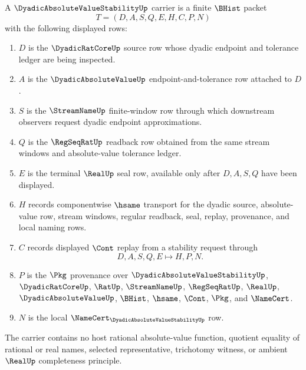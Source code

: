 \begin{definition}
\label{def:dyadic-absolute-value-stability-carrier}
A $\DyadicAbsoluteValueStabilityUp$ carrier is a finite $\BHist$ packet
$$
T=(D,A,S,Q,E,H,C,P,N)
$$
with the following displayed rows:
\begin{enumerate}
\item $D$ is the $\DyadicRatCoreUp$ source row whose dyadic endpoint and tolerance ledger are being inspected.
\item $A$ is the $\DyadicAbsoluteValueUp$ endpoint-and-tolerance row attached to $D$.
\item $S$ is the $\StreamNameUp$ finite-window row through which downstream observers request dyadic endpoint approximations.
\item $Q$ is the $\RegSeqRatUp$ readback row obtained from the same stream windows and absolute-value tolerance ledger.
\item $E$ is the terminal $\RealUp$ seal row, available only after $D,A,S,Q$ have been displayed.
\item $H$ records componentwise $\hsame$ transport for the dyadic source, absolute-value row, stream windows, regular readback, seal, replay, provenance, and local naming rows.
\item $C$ records displayed $\Cont$ replay from a stability request through
$$
D,A,S,Q,E \longmapsto H,P,N .
$$
\item $P$ is the $\Pkg$ provenance over $\DyadicAbsoluteValueStabilityUp$, $\DyadicRatCoreUp$, $\RatUp$, $\StreamNameUp$, $\RegSeqRatUp$, $\RealUp$, $\DyadicAbsoluteValueUp$, $\BHist$, $\hsame$, $\Cont$, $\Pkg$, and $\NameCert$.
\item $N$ is the local $\NameCert_{\DyadicAbsoluteValueStabilityUp}$ row.
\end{enumerate}
The carrier contains no host rational absolute-value function, quotient equality of rational or real names, selected representative, trichotomy witness, or ambient $\RealUp$ completeness principle.
\end{definition}

